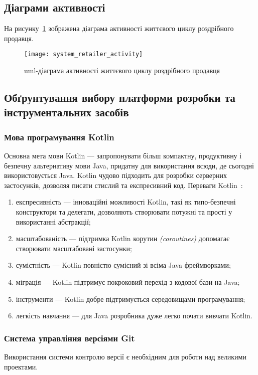 \subsection{Діаграми активності}
На рисунку~\ref{fig:system_retailer_activity} зображена діаграма активності життєвого циклу роздрібного продавця.

\begin{figure}[H]
	\centering
	\texttt{[image: system\_retailer\_activity]}
	\caption{\acrshort{uml}-діаграма активності життєвого циклу роздрібного продавця}
	\label{fig:system_retailer_activity}
\end{figure} 

\subsection{Обґрунтування вибору платформи розробки та інструментальних засобів}
\subsubsection{Мова програмування Kotlin}
Основна мета мови Kotlin --- запропонувати більш компактну, продуктивну і безпечну альтернативу мови Java, придатну для використання всюди, де сьогодні використовується Java.
Kotlin чудово підходить для розробки серверних застосунків, дозволяя писати стислий та експресивний код.
Переваги Kotlin~\cite{kotlin,Panchal2017}:  
\begin{enumerate}[label={\arabic*)}]
	\item експресивність --- інноваційні можливості Kotlin, такі як типо-безпечні конструктори та делегати, дозволяють створювати потужні та прості у використанні абстракції;
	\item масштабованість --- підтримка Kotlin корутин \textit{(coroutines)} допомагає створювати масштабовані застосунки;
	\item сумістність --- Kotlin повністю сумісний зі всіма Java фреймворками;
	\item міграція --- Kotlin підтримує покроковий перехід з кодової бази на Java;
	\item інструменти --- Kotlin добре підтримується середовищами програмування;
	\item легкість навчання --- для Java розробника дуже легко почати вивчати Kotlin.
\end{enumerate}

\subsubsection{Система управління версіями Git}
Використання системи контролю версії є необхідним для роботи над великими проектами.

